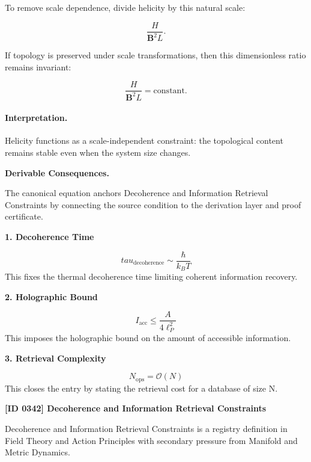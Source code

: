 To remove scale dependence, divide helicity by this natural scale:

\begin{equation}
\frac{H}{\mathbf{B}^2L}.
\end{equation}

If topology is preserved under scale transformations, then this dimensionless ratio remains invariant:

\begin{equation}
\boxed{
\frac{H}{\mathbf{B}^2 L}
=
\mathrm{constant}.
}
\end{equation}

\paragraph{Interpretation.}
Helicity functions as a scale-independent constraint: the topological content remains stable even when the system size changes.

\par\vspace{0.35em}
\noindent\textbf{Derivable Consequences.}\quad
\begingroup
\footnotesize
\raggedright
The canonical equation anchors Decoherence and Information Retrieval Constraints by connecting the source condition to the derivation layer and proof certificate.
\par\endgroup

\noindent\textbf{1. Decoherence Time}\par
\[
tau_{\mathrm{decoherence}} \sim \frac{\hbar}{k_B T}
\]
\noindent This fixes the thermal decoherence time limiting coherent information recovery.\par
\noindent\textbf{2. Holographic Bound}\par
\[
I_{\mathrm{acc}} \le \frac{A}{4\ell_P^2}
\]
\noindent This imposes the holographic bound on the amount of accessible information.\par
\noindent\textbf{3. Retrieval Complexity}\par
\[
N_{\mathrm{ops}}=\mathcal{O}(N)
\]
\noindent This closes the entry by stating the retrieval cost for a database of size N.\par

\clearpage
\noindent\textbf{[ID 0342] Decoherence and Information Retrieval Constraints}\par
\vspace{0.35em}
\begingroup\small
{}
Decoherence and Information Retrieval Constraints is a registry definition in Field Theory and Action Principles with secondary pressure from Manifold and Metric Dynamics.

